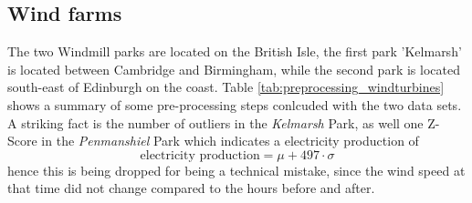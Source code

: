 \documentclass{article}
\begin{document}
\subsection{Wind farms}

The two Windmill parks are located on the British Isle, the first park 'Kelmarsh' is located between Cambridge and Birmingham, while the second park is located south-east of Edinburgh on the coast. 
Table \ref{tab:preprocessing_windturbines} shows a summary of some pre-processing steps conlcuded with the two data sets. A striking fact is the number of outliers in the \textit{Kelmarsh} Park, as well one Z-Score in the \textit{Penmanshiel} Park which indicates a electricity production of
\begin{equation*}
    \text{electricity production} = \mu + 497 \cdot \sigma
\end{equation*}
hence this is being dropped for being a technical mistake, since the wind speed at that time did not change compared to the hours before and after. 
\end{document}
